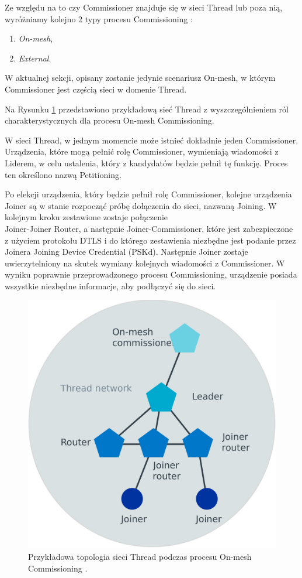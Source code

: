     Ze względu na to czy Commissioner znajduje się w sieci Thread lub poza nią, wyróżniamy kolejno 2 typy procesu Commissioning \cite{thread-commissioning}:
    \begin{enumerate}
        \item \textit{On-mesh},
        \item \textit{External}.
    \end{enumerate}

    W aktualnej sekcji, opisany zostanie jedynie scenariusz On-mesh, w którym Commissioner jest częścią sieci w domenie Thread.

    Na Rysunku \ref{fig:thread-on-mesh-commissioning} przedstawiono przykładową sieć Thread z wyszczególnieniem ról charakterystycznych dla procesu On-mesh Commissioning.

    W sieci Thread, w jednym momencie może istnieć dokładnie jeden Commissioner. Urządzenia, które mogą pełnić rolę Commissioner, wymieniają wiadomości z Liderem, w celu ustalenia, który z kandydatów będzie pełnił tę funkcję. Proces ten określono nazwą Petitioning.

    Po elekcji urządzenia, który będzie pełnił rolę Commissioner, kolejne urządzenia Joiner są w stanie rozpocząć próbę dołączenia do sieci, nazwaną Joining.
    W kolejnym kroku zestawione zostaje połączenie \\ Joiner-Joiner Router, a następnie Joiner-Commissioner, które jest zabezpieczone z użyciem protokołu DTLS i do którego zestawienia niezbędne jest podanie przez Joinera Joining Device Credential (PSKd). Następnie Joiner zostaje uwierzytelniony na skutek wymiany kolejnych wiadomości z Commissioner. W wyniku poprawnie przeprowadzonego procesu Commissioning, urządzenie posiada wszystkie niezbędne informacje, aby podłączyć się do sieci.

    \begin{figure}[H]
        \centering
        \includegraphics[width=0.8\linewidth]{graphics/external/Thread_on-mesh_commissioning.jpg}
        \caption{Przykładowa topologia sieci Thread podczas procesu On-mesh Commissioning \cite{thread-commissioning}.}
        \label{fig:thread-on-mesh-commissioning}
    \end{figure}

